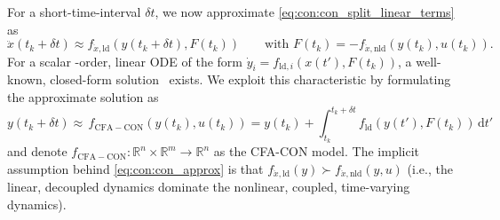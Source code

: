 For a short-time-interval $\delta t$, we now approximate \eqref{eq:con:con_split_linear_terms} as
\begin{equation}\label{eq:con:con_approx}
    \ddot{x}(t_k+\delta t) \approx f_{\ddot{x}, \mathrm{ld}}(y(t_k+\delta t), F(t_k)) 
    \qquad \text{with  }
    F(t_k) =  -f_{\ddot{x}, \mathrm{nld}}(y(t_k), u(t_k)).
\end{equation}
For a scalar -order, linear \gls{ODE} of the form $\dot{y}_i = f_{\mathrm{ld},i}(x(t'), F(t_k))$, a well-known, closed-form solution~\citep{Pas2023damped} exists.
We exploit this characteristic by formulating the approximate solution as 
\begin{equation}\label{eq:con:cfa_con}
    y(t_k + \delta t) \approx \, f_\mathrm{CFA-CON}(y(t_k), u(t_k)) =  y(t_k) + \int_{t_k}^{t_k + \delta t} f_{\mathrm{ld}}(y(t'), F(t_k)) \, \mathrm{d}t'
\end{equation}
and denote $f_\mathrm{CFA-CON}: \mathbb{R}^n \times \mathbb{R}^m \to \mathbb{R}^n$ as the \gls{CFA-CON} model.
The implicit assumption behind \eqref{eq:con:con_approx} is that $f_{\ddot{x}, \mathrm{ld}}(y) \succ f_{\ddot{x}, \mathrm{nld}}(y, u)$ (i.e., the linear, decoupled dynamics dominate the nonlinear, coupled, time-varying dynamics).



